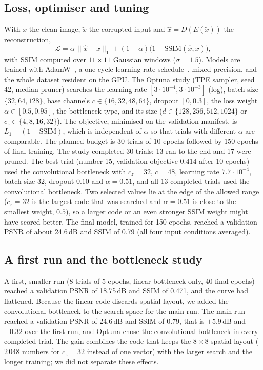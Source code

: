 \documentclass[conference]{IEEEtran}
\newcommand{\Ltwo}{\ensuremath{\mathcal{L}}}
\begin{document}
\subsection{Loss, optimiser and tuning}
With $x$ the clean image, $\tilde{x}$ the corrupted input and $\hat{x}=D(E(\tilde{x}))$ the reconstruction,
\begin{equation}
\Ltwo=\alpha\,\lVert\hat{x}-x\rVert_1+(1-\alpha)\bigl(1-\mathrm{SSIM}(\hat{x},x)\bigr),
\end{equation}
with SSIM computed over $11\times11$ Gaussian windows ($\sigma=1.5$). Models are trained with AdamW~\cite{loshchilov2019}, a one-cycle learning-rate schedule~\cite{smith2019}, mixed precision, and the whole dataset resident on the GPU.
The Optuna study (TPE sampler, seed 42, median pruner) searches the learning rate $[3\cdot10^{-4},3\cdot10^{-3}]$ (log), batch size $\{32,64,128\}$, base channels $c\in\{16,32,48,64\}$, dropout $[0,0.3]$, the loss weight $\alpha\in[0.5,0.95]$, the bottleneck type,
and its size ($d\in\{128,256,512,1024\}$ or $c_z\in\{4,8,16,32\}$). The objective, minimised on the validation manifest, is $L_1+(1-\mathrm{SSIM})$, which is independent of $\alpha$ so that trials with different $\alpha$ are comparable.
The planned budget is 30 trials of 10 epochs followed by 150 epochs of final training. The study completed 30 trials: 13 ran to the end and 17 were pruned. The best trial (number 15, validation objective 0.414 after 10 epochs) used the convolutional bottleneck with $c_z=32$, $c=48$, learning rate $7.7\cdot10^{-4}$, batch size 32, dropout $0.10$ and $\alpha=0.51$,
and all 13 completed trials used the convolutional bottleneck. Two selected values lie at the edge of the allowed range ($c_z=32$ is the largest code that was searched and $\alpha=0.51$ is close to the smallest weight, $0.5$), so a larger code or an even stronger SSIM weight might have scored better.
The final model, trained for 150 epochs, reached a validation PSNR of about 24.6\,dB and SSIM of 0.79 (all four input conditions averaged).

\subsection{A first run and the bottleneck study}
A first, smaller run (8 trials of 5 epochs, linear bottleneck only, 40 final epochs) reached a validation PSNR of 18.75\,dB and SSIM of 0.471, and the curve had flattened. Because the linear code discards spatial layout, we added the convolutional bottleneck to the
search space for the main run. The main run reached a validation PSNR of 24.6\,dB and SSIM of 0.79, that is $+5.9$\,dB and $+0.32$ over the first run, and Optuna chose the convolutional bottleneck in every completed trial.
The gain combines the code that keeps the $8\times8$ spatial layout ($2\,048$ numbers for $c_z=32$ instead of one vector) with the larger search and the longer training; we did not separate these effects.
\end{document}
